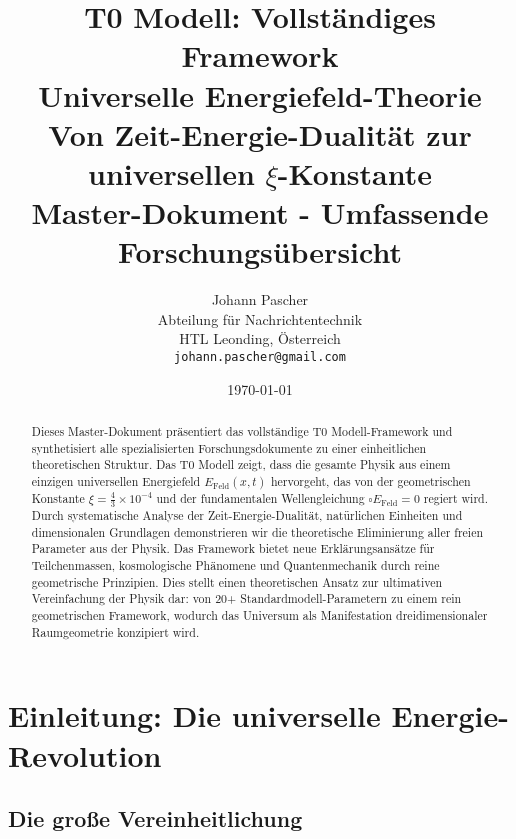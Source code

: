 \documentclass[12pt,a4paper]{report}
\newcommand{\xikonst}{\xi = \frac{4}{3} \times 10^{-4}}
\begin{document}
	
	\title{{\Huge T0 Modell: Vollständiges Framework}\\
		{\LARGE Universelle Energiefeld-Theorie}\\
		{\Large Von Zeit-Energie-Dualität zur universellen $\xi$-Konstante}\\
		\vspace{1cm}
		{\large Master-Dokument - Umfassende Forschungsübersicht}}
	
	\author{{\Large Johann Pascher}\\
		Abteilung für Nachrichtentechnik\\
		HTL Leonding, Österreich\\
		\texttt{johann.pascher@gmail.com}}
	
	\date{\today}
	
	\maketitle
	
	\begin{abstract}
		Dieses Master-Dokument präsentiert das vollständige T0 Modell-Framework und synthetisiert alle spezialisierten Forschungsdokumente zu einer einheitlichen theoretischen Struktur. Das T0 Modell zeigt, dass die gesamte Physik aus einem einzigen universellen Energiefeld $E_{\text{Feld}}(x,t)$ hervorgeht, das von der geometrischen Konstante $\xikonst$ und der fundamentalen Wellengleichung $\square E_{\text{Feld}} = 0$ regiert wird. Durch systematische Analyse der Zeit-Energie-Dualität, natürlichen Einheiten und dimensionalen Grundlagen demonstrieren wir die theoretische Eliminierung aller freien Parameter aus der Physik. Das Framework bietet neue Erklärungsansätze für Teilchenmassen, kosmologische Phänomene und Quantenmechanik durch reine geometrische Prinzipien. Dies stellt einen theoretischen Ansatz zur ultimativen Vereinfachung der Physik dar: von 20+ Standardmodell-Parametern zu einem rein geometrischen Framework, wodurch das Universum als Manifestation dreidimensionaler Raumgeometrie konzipiert wird.
	\end{abstract}
	
	\tableofcontents
	\listoftables
	
	\chapter{Einleitung: Die universelle Energie-Revolution}
	
	\section{Die große Vereinheitlichung}
	
\end{document}
